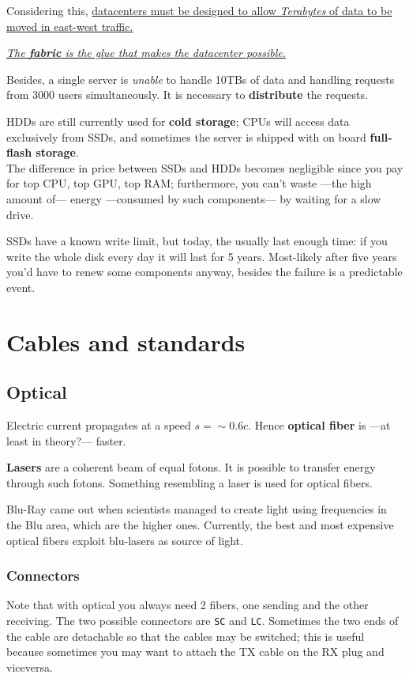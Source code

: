 Considering this, \ul{datacenters must be designed to allow \textit{Terabytes} of data to be moved in east-west traffic.}

\begin{center}
   \ul{\textit{The \textbf{fabric} is the glue that makes the datacenter possible.}}
\end{center}

Besides, a single server is \textit{unable} to handle 10TBs of data and handling requests from 3000 users simultaneously. It is necessary to \textbf{distribute} the requests.

HDDs are still currently used for \textbf{cold storage};
CPUs will access data exclusively from SSDs, and sometimes the server is shipped with on board \textbf{full-flash storage}.\\
The difference in price between SSDs and HDDs becomes negligible since you pay for top CPU, top GPU, top RAM;
furthermore, you can't waste ---the high amount of--- energy ---consumed by such components--- by waiting for a slow drive.

SSDs have a known write limit, but today, the usually last enough time: if you write the whole disk every day it will last for 5 years. Most-likely after five years you'd have to renew some components anyway, besides the failure is a predictable event.

\section{Cables and standards}
\subsection{Optical}
Electric current propagates at a speed $s = {\sim}0.6c$.
Hence \textbf{optical fiber} is ---at least in theory?--- faster.

\textbf{Lasers} are a coherent beam of equal fotons. It is possible to transfer energy through such fotons. Something resembling a laser is used for optical fibers.

Blu-Ray came out when scientists managed to create light using frequencies in the Blu area, which are the higher ones.
Currently, the best and most expensive optical fibers exploit blu-lasers as source of light.

\subsubsection{Connectors}
Note that with optical you always need 2 fibers, one sending and the other receiving. The two possible connectors are \texttt{SC} and \texttt{LC}.
Sometimes the two ends of the cable are detachable so that the cables may be switched; this is useful because sometimes you may want to attach the TX cable on the RX plug and viceversa. 

